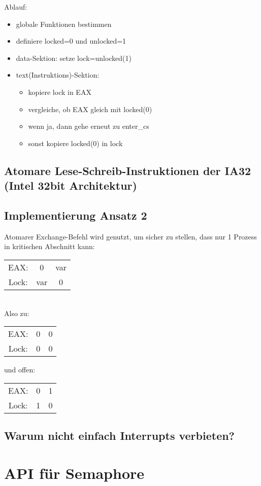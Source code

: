 Ablauf:
\begin{itemize}
\item globale Funktionen bestimmen
\item definiere locked=0 und unlocked=1
\item data-Sektion: setze lock=unlocked(1)
\item text(Instruktions)-Sektion:
\begin{itemize}
\item kopiere lock in EAX
\item vergleiche, ob EAX gleich mit locked(0)
\item wenn ja, dann gehe erneut zu enter\_cs
\item sonst kopiere locked(0) in lock
\end{itemize}
\end{itemize}
\subsection{Atomare Lese-Schreib-Instruktionen der IA32 (Intel 32bit Architektur)}

\subsection{Implementierung Ansatz 2}
Atomarer Exchange-Befehl wird genutzt, um sicher zu stellen, dass nur 1 Prozess in kritischen Abschnitt kann:\\
\begin{tabular}{c c | c}
EAX: & 0 & var\\
Lock: & var & 0
\end{tabular}\\
Also zu: \begin{tabular}{c c | c}
EAX: & 0 & 0\\
Lock: & 0 & 0
\end{tabular} 
und offen: \begin{tabular}{c c | c}
EAX: & 0 & 1\\
Lock: & 1 & 0
\end{tabular}

\subsection{Warum nicht einfach Interrupts verbieten?}

\section{API für Semaphore}
